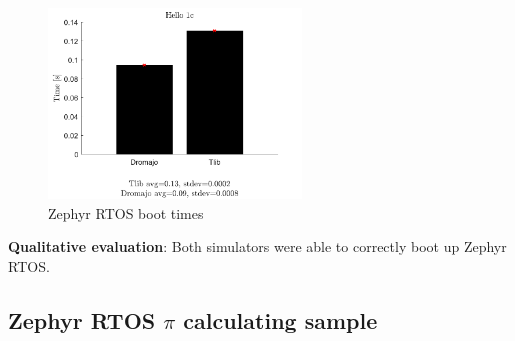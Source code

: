\begin{figure}[h]
	\centering
	\includegraphics[width=0.6\textwidth]{figures/benchmarks/Hello1c.pdf}
	\caption{Zephyr RTOS boot times}
\end{figure}
\noindent
\textbf{Qualitative evaluation}: Both simulators were able to correctly boot up Zephyr RTOS.
\vspace*{15px}

\subsection{Zephyr RTOS $\pi$ calculating sample}

